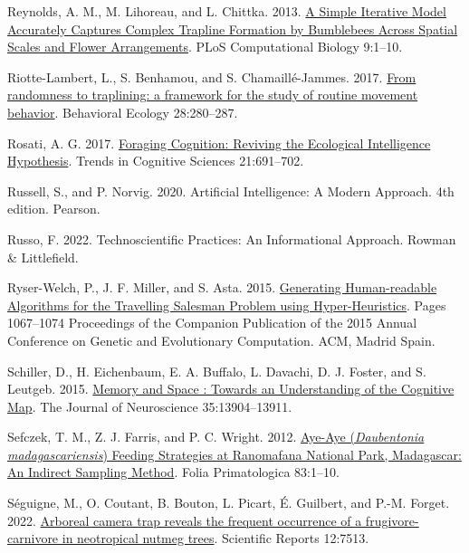 \documentclass[twoside,12pt,final]{ucthesis-CA2012}
\newenvironment{CSLReferences}%
  {}%
  {\par}
\begin{document}
\begin{ucmainmatter}
\begin{CSLReferences}{1}{0}
\leavevmode{}%
Reynolds, A. M., M. Lihoreau, and L. Chittka. 2013. \href{https://doi.org/10.1371/journal.pcbi.1002938}{A Simple Iterative Model Accurately Captures Complex Trapline Formation by Bumblebees Across Spatial Scales and Flower Arrangements}. PLoS Computational Biology 9:1--10.

\leavevmode{}%
Riotte-Lambert, L., S. Benhamou, and S. Chamaillé-Jammes. 2017. \href{https://doi.org/10.1093/beheco/arw154}{From randomness to traplining: a framework for the study of routine movement behavior}. Behavioral Ecology 28:280--287.

\leavevmode{}%
Rosati, A. G. 2017. \href{https://doi.org/10.1016/j.tics.2017.05.011}{Foraging Cognition: Reviving the Ecological Intelligence Hypothesis}. Trends in Cognitive Sciences 21:691--702.

\leavevmode{}%
Russell, S., and P. Norvig. 2020. Artificial Intelligence: A Modern Approach. 4th edition. Pearson.

\leavevmode{}%
Russo, F. 2022. Technoscientific Practices: An Informational Approach. Rowman \& Littlefield.

\leavevmode{}%
Ryser-Welch, P., J. F. Miller, and S. Asta. 2015. \href{https://doi.org/10.1145/2739482.2768459}{Generating Human-readable Algorithms for the Travelling Salesman Problem using Hyper-Heuristics}. Pages 1067--1074 Proceedings of the Companion Publication of the 2015 Annual Conference on Genetic and Evolutionary Computation. ACM, Madrid Spain.

\leavevmode{}%
Schiller, D., H. Eichenbaum, E. A. Buffalo, L. Davachi, D. J. Foster, and S. Leutgeb. 2015. \href{https://doi.org/10.1523/JNEUROSCI.2618-15.2015}{Memory and Space : Towards an Understanding of the Cognitive Map}. The Journal of Neuroscience 35:13904--13911.

\leavevmode{}%
Sefczek, T. M., Z. J. Farris, and P. C. Wright. 2012. \href{https://doi.org/10.1159/000338103}{Aye-Aye (\emph{Daubentonia madagascariensis}) Feeding Strategies at Ranomafana National Park, Madagascar: An Indirect Sampling Method}. Folia Primatologica 83:1--10.

\leavevmode{}%
Séguigne, M., O. Coutant, B. Bouton, L. Picart, É. Guilbert, and P.-M. Forget. 2022. \href{https://doi.org/10.1038/s41598-022-11568-z}{Arboreal camera trap reveals the frequent occurrence of a frugivore-carnivore in neotropical nutmeg trees}. Scientific Reports 12:7513.


\end{CSLReferences}
\end{ucmainmatter}
\end{document}
